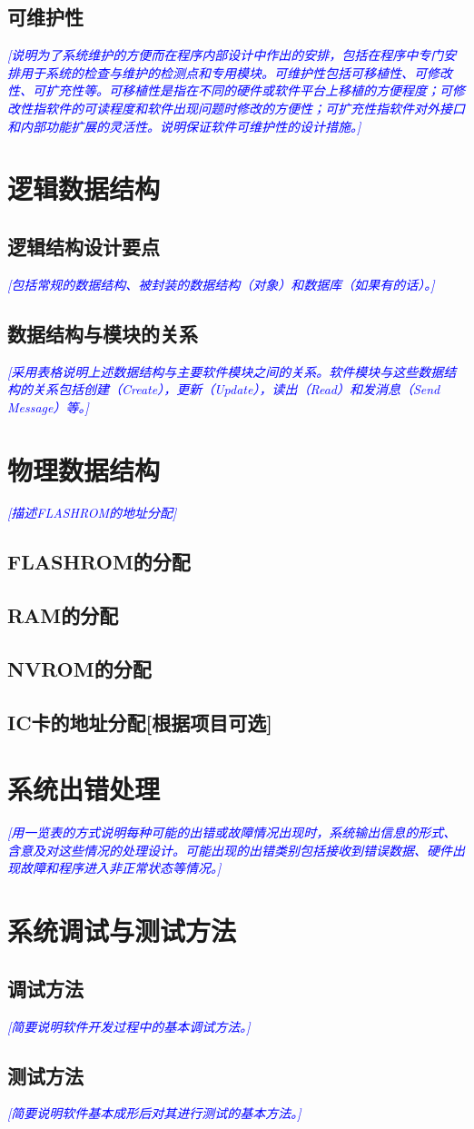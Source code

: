 \documentclass[UTF8]{ctexart}
\newcommand{\note}[1]{\textcolor{blue}{\emph{[#1]}}}   %
\begin{document}
    \subsection{可维护性}
    \note{说明为了系统维护的方便而在程序内部设计中作出的安排，包括在程序中专门安排用于系统的检查与维护的检测点和专用模块。可维护性包括可移植性、可修改性、可扩充性等。可移植性是指在不同的硬件或软件平台上移植的方便程度；可修改性指软件的可读程度和软件出现问题时修改的方便性；可扩充性指软件对外接口和内部功能扩展的灵活性。说明保证软件可维护性的设计措施。}
    
    \section{逻辑数据结构}
    \subsection{逻辑结构设计要点}
    \note{包括常规的数据结构、被封装的数据结构（对象）和数据库（如果有的话）。}
    \subsection{数据结构与模块的关系}
    \note{采用表格说明上述数据结构与主要软件模块之间的关系。软件模块与这些数据结构的关系包括创建（Create），更新（Update），读出（Read）和发消息（Send Message）等。}
    
    \section{物理数据结构}
    \note{描述FLASHROM的地址分配}
    \subsection{FLASHROM的分配}
    \subsection{RAM的分配}
    \subsection{NVROM的分配}
    \subsection{IC卡的地址分配[根据项目可选]}
    
    \newpage
    \section{系统出错处理}
    \note{用一览表的方式说明每种可能的出错或故障情况出现时，系统输出信息的形式、含意及对这些情况的处理设计。可能出现的出错类别包括接收到错误数据、硬件出现故障和程序进入非正常状态等情况。}
    \section{系统调试与测试方法}
		\subsection{调试方法}
		\note{简要说明软件开发过程中的基本调试方法。}
		\subsection{测试方法}
		\note{简要说明软件基本成形后对其进行测试的基本方法。}
\end{document}
